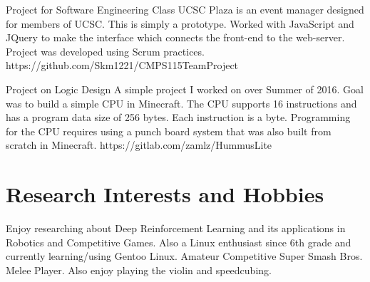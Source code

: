 \documentclass{cv}
\begin{document}
\begin{adjustwidth}{0.5cm}{0.5cm}
{Project for Software Engineering Class}
{UCSC Plaza is an event manager designed for members of UCSC. This is simply
a prototype. Worked with JavaScript and JQuery to make the interface which
connects the front-end to the web-server. Project was developed using Scrum
practices.}
{https://github.com/Skm1221/CMPS115TeamProject}

{Project on Logic Design}
{A simple project I worked on over Summer of 2016. Goal was to build a simple
CPU in Minecraft. The CPU supports 16 instructions and has a program data
size of 256 bytes. Each instruction is a byte. Programming for the CPU
requires using a punch board system that was also built from scratch in
Minecraft.}
{https://gitlab.com/zamlz/HummusLite}
\end{adjustwidth}

\section{Research Interests and Hobbies}
\begin{adjustwidth}{0.5cm}{0.5cm}
Enjoy researching about Deep Reinforcement Learning and its applications
in Robotics and Competitive Games. Also a Linux enthusiast since 6th grade and
currently learning/using Gentoo Linux. Amateur Competitive Super Smash
Bros. Melee Player. Also enjoy playing the violin and speedcubing.

\end{adjustwidth}
\end{document}
